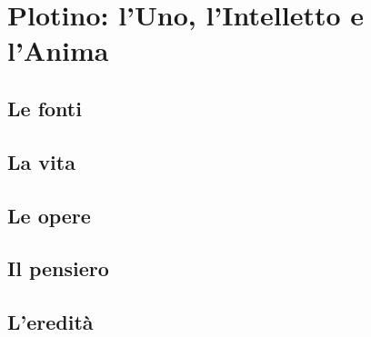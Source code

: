 \chapter{Plotino: l'Uno, l'Intelletto e l'Anima}

\section{Le fonti}

\section{La vita}

\section{Le opere}

\section{Il pensiero}

\section{L'eredità}
